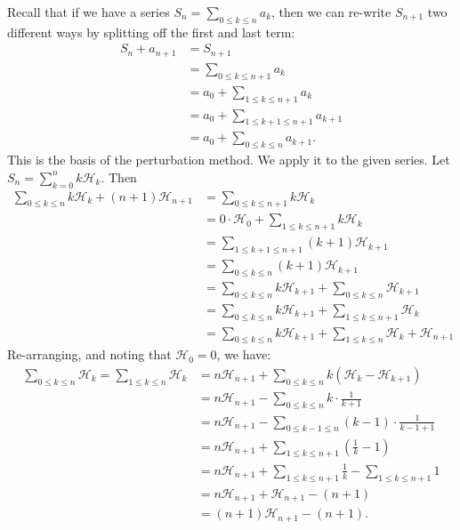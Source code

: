 \documentclass[12pt]{article}
\newenvironment{sol}[1][Solution]{\begin{trivlist}
		\item[\hskip \labelsep {\bfseries #1:}]}{\end{trivlist}}
\begin{document}
\begin{sol}
	Recall that if we have a series $S_n=\sum_{0\leq k\leq n}a_k$, then we
	can re-write $S_{n+1}$ two different ways by splitting off the first and
	last term:
	\begin{align*}
		S_n+a_{n+1}&=S_{n+1}\\
		&=\sum_{0\leq k\leq n+1}a_k\\
		&=a_0+\sum_{1\leq k\leq n+1}a_k\\
		&=a_0+\sum_{1\leq k+1\leq n+1}a_{k+1}\\
		&=a_0+\sum_{0\leq k\leq n}a_{k+1}.
	\end{align*}
	This is the basis of the perturbation method. We apply it to the given
	series. Let $S_n=\sum_{k=0}^{n}k\mathcal{H}_k$. Then
	\begin{align*}
		\sum_{0\leq k\leq n}k\mathcal{H}_k+(n+1)\mathcal{H}_{n+1}
		&=\sum_{0\leq k\leq n+1}k\mathcal{H}_{k}\\
		&=0\cdot \mathcal{H}_0+\sum_{1\leq k\leq n+1}k\mathcal{H}_k\\
		&=\sum_{1\leq k+1\leq n+1}(k+1)\mathcal{H}_{k+1}\\
		&=\sum_{0\leq k\leq n}(k+1)\mathcal{H}_{k+1}\\
		&=\sum_{0\leq k\leq n}k\mathcal{H}_{k+1}+\sum_{0\leq k\leq n}\mathcal{H}_{k+1}\\
		&=\sum_{0\leq k\leq n}k\mathcal{H}_{k+1}+\sum_{1\leq k\leq n+1}\mathcal{H}_k\\
		&=\sum_{0\leq k\leq n}k\mathcal{H}_{k+1}+\sum_{1\leq k\leq n}\mathcal{H}_k+\mathcal{H}_{n+1}
	\end{align*}
	Re-arranging, and noting that $\mathcal{H}_0=0$, we have:
	\begin{align*}
		\sum_{0\leq k\leq n}\mathcal{H}_k=\sum_{1\leq k\leq n}\mathcal{H}_k
		&=n\mathcal{H}_{n+1}+\sum_{0\leq k\leq n}k(\mathcal{H}_k-\mathcal{H}_{k+1})\\
		&=n\mathcal{H}_{n+1}-\sum_{0\leq k\leq n}k\cdot \frac{1}{k+1}\\
		&=n\mathcal{H}_{n+1}-\sum_{0\leq k-1\leq n}(k-1)\cdot \frac{1}{k-1+1}\\
		&=n\mathcal{H}_{n+1}+\sum_{1\leq k\leq n+1}\left(\frac{1}{k}-1\right)\\
		&=n\mathcal{H}_{n+1}+\sum_{1\leq k\leq n+1}\frac{1}{k}-\sum_{1\leq k\leq n+1}1\\
		&=n\mathcal{H}_{n+1}+\mathcal{H}_{n+1}-(n+1)\\
		&=(n+1)\mathcal{H}_{n+1}-(n+1).
	\end{align*}
\end{sol}
\end{document}
